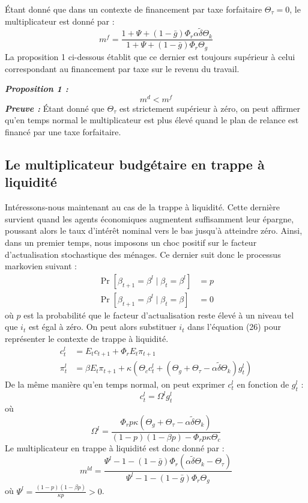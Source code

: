 \documentclass[12pt,letterpaper]{article}
\newcommand{\Et}{E_t}
\newcommand{\gbar}{\bar{g}}
\newcommand{\dtilde}{\tilde{\delta}}
\newcommand{\Theg}{\Theta_g}
\newcommand{\Thec}{\Theta_c}
\newcommand{\Thek}{\Theta_k}
\newcommand{\Thet}{\Theta_\tau}
\newcommand{\Phir}{\Phi_r}
\begin{document}
Étant donné que dans un contexte de financement par taxe forfaitaire $\Thet = 0$, le multiplicateur est donné par :
\begin{equation}
m^f = \frac{1 + \Psi + (1-\gbar)\Phir\alpha\dtilde\Thek}{1 + \Psi + (1-\gbar)\Phir\Theg} \tag{45}
\end{equation}
La proposition 1 ci-dessous établit que ce dernier est toujours supérieur à celui correspondant au financement par taxe sur le revenu du travail.

\medskip
\noindent\textbf{\emph{Proposition 1 :}}
\begin{equation}
m^d < m^f \tag{46}
\end{equation}
\noindent\textbf{\emph{Preuve :}} Étant donné que $\Thet$ est strictement supérieur à zéro, on peut affirmer qu’en temps normal le multiplicateur est plus élevé quand le plan de relance est financé par une taxe forfaitaire.

\subsection{Le multiplicateur budgétaire en trappe à liquidité}

Intéressons-nous maintenant au cas de la trappe à liquidité. Cette dernière survient quand les agents économiques augmentent suffisamment leur épargne, poussant alors le taux d’intérêt nominal vers le bas jusqu’à atteindre zéro. Ainsi, dans un premier temps, nous imposons un choc positif sur le facteur d’actualisation stochastique des ménages. Ce dernier suit donc le processus markovien suivant :
\begin{align}
\Pr[\beta_{t+1} = \beta^l \mid \beta_t = \beta^l] &= p \nonumber\\
\Pr[\beta_{t+1} = \beta^l \mid \beta_t = \beta] &= 0 \tag{47}
\end{align}
où $p$ est la probabilité que le facteur d’actualisation reste élevé à un niveau tel que $i_t$ est égal à zéro. On peut alors substituer $i_t$ dans l’équation (26) pour représenter le contexte de trappe à liquidité.
\begin{align}
c^l_t &= \Et c_{t+1} + \Phir\Et\pi_{t+1} \tag{48}\\
\pi^l_t &= \beta\Et\pi_{t+1} + \kappa\left(\Thec c^l_t + (\Theg + \Thet - \alpha\dtilde\Thek)g^l_t\right) \tag{49}
\end{align}
De la même manière qu’en temps normal, on peut exprimer $c^l_t$ en fonction de $g^l_t$ :
\begin{equation}
c^l_t = \Omega^l g^l_t \tag{50}
\end{equation}
où
\begin{equation}
\Omega^l = \frac{\Phir p\kappa\left(\Theg + \Thet - \alpha\dtilde\Thek\right)}{(1-p)(1-\beta p) - \Phir p\kappa\Thec} \tag{51}
\end{equation}
Le multiplicateur en trappe à liquidité est donc donné par :
\begin{equation}
m^{ld} = \frac{\Psi^l - 1 - (1-\gbar)\Phir\left(\alpha\dtilde\Thek - \Thet\right)}{\Psi^l - 1 - (1-\gbar)\Phir\Theg} \tag{52}
\end{equation}
où $\Psi^l = \frac{(1-p)(1-\beta p)}{\kappa p} > 0$.
\end{document}
